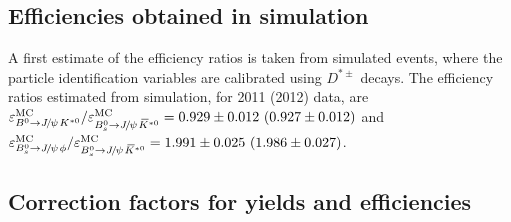\documentclass[12pt,a4paper]{article}
\def\PJ      {\ensuremath{J}\xspace}
\def\Ppsi {\ensuremath{\psi}\xspace}
\def\jpsi     {{\ensuremath{{\PJ\mskip -3mu/\mskip -2mu\Ppsi\mskip 2mu}}}\xspace}
\newcommand{\Dstpm}{\ensuremath{D^{*\pm}}\xspace}
\newcommand{\BdJpsiKst}{\ensuremath{B^0\to \jpsi K^{*0}}\xspace}
\newcommand{\BsJpsiKst}{\ensuremath{B^0_s\to \jpsi \Kstarzb}\xspace}
\newcommand{\BsJpsiPhi}{\ensuremath{B^0_s\to \jpsi \phi}\xspace}
\def\Kbar  {\kern 0.2em\overline{\kern -0.2em K}{}\xspace}
\def\Kstarzb {\ensuremath{\Kbar^{*0}}\xspace}
\begin{document}
\subsection{Efficiencies obtained in simulation} 
A first estimate of the efficiency ratios is taken from simulated events, where the particle identification variables are calibrated using \Dstpm decays.
The efficiency ratios estimated from simulation, for 2011 (2012) data, are
$\varepsilon_{\BdJpsiKst}^{\rm MC}/\varepsilon_{\BsJpsiKst}^{\rm MC} = 0.929 \pm 0.012~(0.927 \pm 0.012)$
and \mbox{$\varepsilon_{\BsJpsiPhi}^{\rm MC}/\varepsilon_{\BsJpsiKst}^{\rm MC} = 1.991 \pm 0.025~(1.986 \pm 0.027)$}.

\subsection{Correction factors for yields and efficiencies}
\end{document}
